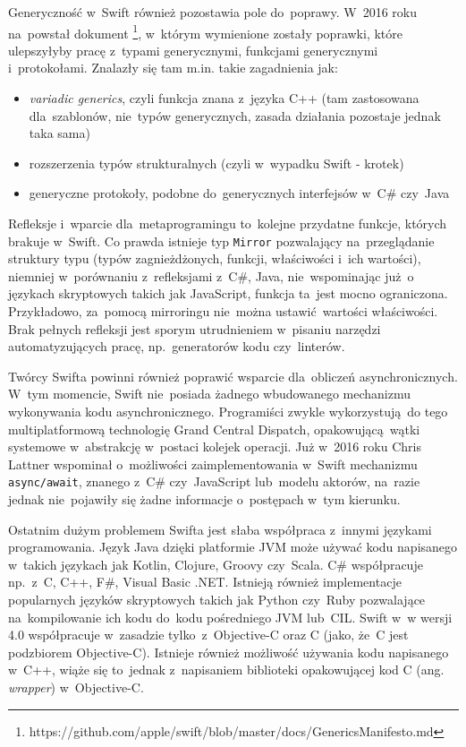 \documentclass[mgr, shortabstract]{iithesis}
\newcommand{\ang}[1]{ang. \textit{#1}}
\newcommand{\swiftinline}[1]{
    \texttt{#1}
}
\begin{document}
Generyczność w~Swift również pozostawia pole do~poprawy. W~2016 roku na~powstał dokument \footnote{https://github.com/apple/swift/blob/master/docs/GenericsManifesto.md}, w~którym wymienione zostały poprawki, które ulepszyłyby pracę z~typami generycznymi, funkcjami generycznymi i~protokołami. Znalazły się tam m.in. takie zagadnienia jak:
\begin{itemize}
    \item \textit{variadic generics}, czyli funkcja znana z~języka C++ (tam zastosowana dla~szablonów, nie~typów generycznych, zasada działania pozostaje jednak taka sama)
    \item rozszerzenia typów strukturalnych (czyli w~wypadku Swift - krotek)
    \item generyczne protokoły, podobne do~generycznych interfejsów w~C\# czy~Java
\end{itemize}

Refleksje i~wparcie dla~metaprogramingu to~kolejne przydatne funkcje, których brakuje w~Swift. Co prawda istnieje typ \swiftinline{Mirror} pozwalający na~przeglądanie struktury typu (typów zagnieżdżonych, funkcji, właściwości i~ich wartości), niemniej w~porównaniu z~refleksjami z~C\#, Java, nie~wspominając już o językach skryptowych takich jak JavaScript, funkcja ta~jest mocno ograniczona. Przykładowo, za~pomocą mirroringu nie~można ustawić wartości właściwości. Brak pełnych refleksji jest sporym utrudnieniem w~pisaniu narzędzi automatyzujących pracę, np.~generatorów kodu czy~linterów.

Twórcy Swifta powinni również poprawić wsparcie dla~obliczeń asynchronicznych. W~tym momencie, Swift nie~posiada żadnego wbudowanego mechanizmu wykonywania kodu asynchronicznego. Programiści zwykle wykorzystują do tego multiplatformową technologię Grand Central Dispatch, opakowującą wątki systemowe w~abstrakcję w~postaci kolejek operacji. Już w~2016 roku Chris Lattner wspominał o~możliwości zaimplementowania w~Swift mechanizmu \texttt{async/await}, znanego z~C\# czy~JavaScript lub~modelu aktorów, na~razie jednak nie~pojawiły się żadne informacje o~postępach w~tym kierunku.

Ostatnim dużym problemem Swifta jest słaba współpraca z~innymi językami programowania. Język Java dzięki platformie JVM może używać kodu napisanego w~takich językach jak Kotlin, Clojure, Groovy czy~Scala. C\# współpracuje np.~z~C, C++, F\#, Visual Basic .NET. Istnieją również implementacje popularnych języków skryptowych takich jak Python czy~Ruby pozwalające na~kompilowanie ich kodu do~kodu pośredniego JVM lub~CIL. Swift w~w wersji 4.0 współpracuje w~zasadzie tylko~z~Objective-C oraz C (jako, że~C jest podzbiorem Objective-C). Istnieje również możliwość używania kodu napisanego w~C++, wiąże się to~jednak z~napisaniem biblioteki opakowującej kod C (\ang{wrapper}) w~Objective-C.


\end{document}
